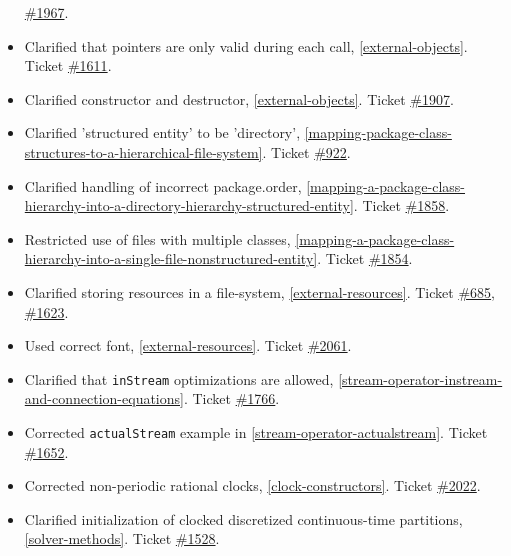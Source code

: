 \begin{itemize}
  \href{https://github.com/modelica/ModelicaSpecification/issues/1967}{\#1967}.
\item
  Clarified that pointers are only valid during each call, \cref{external-objects}. Ticket
  \href{https://github.com/modelica/ModelicaSpecification/issues/1611}{\#1611}.
\item
  Clarified constructor and destructor, \cref{external-objects}. Ticket
  \href{https://github.com/modelica/ModelicaSpecification/issues/1907}{\#1907}.
\item
  Clarified 'structured entity' to be 'directory', \cref{mapping-package-class-structures-to-a-hierarchical-file-system}.
  Ticket \href{https://github.com/modelica/ModelicaSpecification/issues/922}{\#922}.
\item
  Clarified handling of incorrect package.order, \cref{mapping-a-package-class-hierarchy-into-a-directory-hierarchy-structured-entity}.
  Ticket \href{https://github.com/modelica/ModelicaSpecification/issues/1858}{\#1858}.
\item
  Restricted use of files with multiple classes, \cref{mapping-a-package-class-hierarchy-into-a-single-file-nonstructured-entity}.
  Ticket \href{https://github.com/modelica/ModelicaSpecification/issues/1854}{\#1854}.
\item
  Clarified storing resources in a file-system, \cref{external-resources}. Ticket
  \href{https://github.com/modelica/ModelicaSpecification/issues/685}{\#685},
  \href{https://github.com/modelica/ModelicaSpecification/issues/1623}{\#1623}.
\item
  Used correct font, \cref{external-resources}. Ticket
  \href{https://github.com/modelica/ModelicaSpecification/issues/2061}{\#2061}.
\item
  Clarified that \lstinline!inStream! optimizations are allowed, \cref{stream-operator-instream-and-connection-equations}.
  Ticket \href{https://github.com/modelica/ModelicaSpecification/issues/1766}{\#1766}.
\item
  Corrected \lstinline!actualStream! example in \cref{stream-operator-actualstream}. Ticket
  \href{https://github.com/modelica/ModelicaSpecification/issues/1652}{\#1652}.
\item
  Corrected non-periodic rational clocks, \cref{clock-constructors}. Ticket
  \href{https://github.com/modelica/ModelicaSpecification/issues/2022}{\#2022}.
\item
  Clarified initialization of clocked discretized continuous-time
  partitions, \cref{solver-methods}. Ticket
  \href{https://github.com/modelica/ModelicaSpecification/issues/1528}{\#1528}.

\end{itemize}

